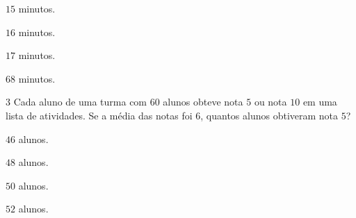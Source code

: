 \begin{escolha}
\item $15$ minutos.
\item $16$ minutos.
\item $17$ minutos.
\item $68$ minutos.
\end{escolha}



\num{3}  Cada aluno de uma turma com $60$ alunos obteve nota $5$ ou nota $10$ em uma
lista de atividades. Se a média das notas foi $6$, quantos alunos
obtiveram nota $5$?

\begin{escolha}
\item $46$ alunos.
\item $48$ alunos.
\item $50$ alunos.
\item $52$ alunos.
\end{escolha}


